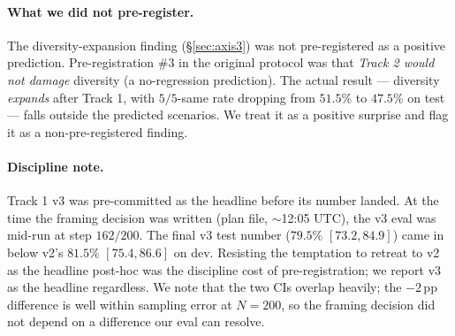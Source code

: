 \paragraph{What we did not pre-register.}
The diversity-expansion finding (\S\ref{sec:axis3}) was not
pre-registered as a positive prediction.  Pre-registration \#3 in
the original protocol was that \emph{Track 2 would not damage}
\cmaj{} diversity (a no-regression prediction).  The actual
result --- diversity \emph{expands} after Track 1, with $5/5$-same
rate dropping from $51.5\%$ to $47.5\%$ on test --- falls outside
the predicted scenarios.  We treat it as a positive surprise and
flag it as a non-pre-registered finding.

\paragraph{Discipline note.}
Track 1 v3 was pre-committed as the headline before its \cmaj{}
number landed.  At the time the framing decision was written
(plan file, $\sim$12:05 UTC), the v3 \cmaj{} eval was mid-run at
step $162/200$.  The final v3 \cmaj{} test number ($79.5\%$
\mbox{$[73.2, 84.9]$}) came in below v2's $81.5\%$ \mbox{$[75.4,
86.6]$} on dev.  Resisting the temptation to retreat to v2 as the
headline post-hoc was the discipline cost of pre-registration; we
report v3 as the headline regardless.  We note that the two CIs
overlap heavily; the $-2$\,pp difference is well within sampling
error at $N{=}200$, so the framing decision did not depend on a
difference our eval can resolve.
